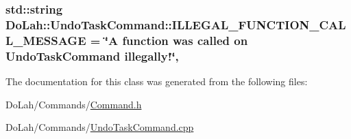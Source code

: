 \subsubsection[{I\+L\+L\+E\+G\+A\+L\+\_\+\+F\+U\+N\+C\+T\+I\+O\+N\+\_\+\+C\+A\+L\+L\+\_\+\+M\+E\+S\+S\+A\+G\+E}]{\setlength{\rightskip}{0pt plus 5cm}std\+::string Do\+Lah\+::\+Undo\+Task\+Command\+::\+I\+L\+L\+E\+G\+A\+L\+\_\+\+F\+U\+N\+C\+T\+I\+O\+N\+\_\+\+C\+A\+L\+L\+\_\+\+M\+E\+S\+S\+A\+G\+E = \char`\"{}A function was called on {\bf Undo\+Task\+Command} illegally!\char`\"{}\hspace{0.3cm}{\ttfamily [static]}, {\ttfamily [private]}}\label{class_do_lah_1_1_undo_task_command_ac3c780c660a741e7850148b8a022ed05}


The documentation for this class was generated from the following files\+:\begin{DoxyCompactItemize}
\item 
Do\+Lah/\+Commands/\hyperlink{_command_8h}{Command.\+h}\item 
Do\+Lah/\+Commands/\hyperlink{_undo_task_command_8cpp}{Undo\+Task\+Command.\+cpp}\end{DoxyCompactItemize}
